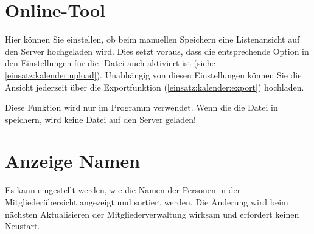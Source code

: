 \section{Online-Tool}
Hier können Sie einstellen, ob beim manuellen Speichern eine Listenansicht auf den Server hochgeladen wird.
Dies setzt voraus, dass die entsprechende Option in den Einstellungen für die \EPL-Datei auch aktiviert ist
(siehe \cref{einsatz:kalender:upload}).
Unabhängig von diesen Einstellungen können Sie die Ansicht jederzeit über die Exportfunktion (\cref{einsatz:kalender:export}) hochladen.

\begin{hinweis}
  Diese Funktion wird nur im Programm \Einsatz verwendet.
  Wenn die die Datei in \Personal speichern, wird keine Datei auf den Server geladen!
\end{hinweis}


\section{Anzeige Namen}
Es kann eingestellt werden, wie die Namen der Personen in der Mitgliederübersicht angezeigt und sortiert werden.
Die Änderung wird beim nächsten Aktualisieren der Mitgliederverwaltung wirksam und erfordert keinen Neustart.
